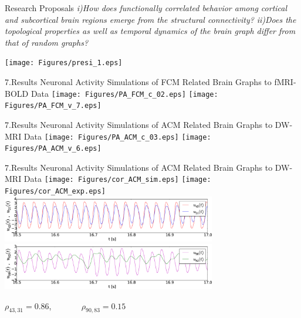 \documentclass{beamer}
\begin{document}
\begin{frame}{Research Proposals}
\footnotesize{\textit{i)How does functionally correlated behavior among cortical and subcortical brain regions emerge from the structural connectivity? }} 
\break
\break
\footnotesize{\textit{ii)Does the topological properties as well as temporal dynamics of the brain graph differ from that of random graphs? }}

\centering
\texttt{[image: Figures/presi\_1.eps]} 

\end{frame}


\begin{frame}{7.Results}
\footnotesize{Neuronal Activity Simulations of FCM Related Brain Graphs to fMRI-BOLD Data} 
\break
\break
\break
\centering
    \texttt{[image: Figures/PA\_FCM\_c\_02.eps]} 
	\texttt{[image: Figures/PA\_FCM\_v\_7.eps]} 
	
\end{frame}




\begin{frame}{7.Results}
\footnotesize{Neuronal Activity Simulations of ACM Related Brain Graphs to DW-MRI Data} 
\break
\break
\break
\centering
    \texttt{[image: Figures/PA\_ACM\_c\_03.eps]} 
	\texttt{[image: Figures/PA\_ACM\_v\_6.eps]} 
	
\end{frame}


\begin{frame}{7.Results}
\footnotesize{Neuronal Activity Simulations of ACM Related Brain Graphs to DW-MRI Data} 
	\centering
	 \texttt{[image: Figures/cor\_ACM\_sim.eps]}  
   	 \texttt{[image: Figures/cor\_ACM\_exp.eps]} \\
    \centering
    \includegraphics[width=0.7\textwidth]{Figures/cor_ACM_sim_no_best.eps}\\ 
	\centering    
    \includegraphics[width=0.7\textwidth]{Figures/cor_ACM_sim_no_worst.eps} 


	\tiny{$\rho_{43,31}=0.86$, ~~~~~~ $\rho_{90,83}=0.15$}	
	
	
\end{frame}
\end{document}
